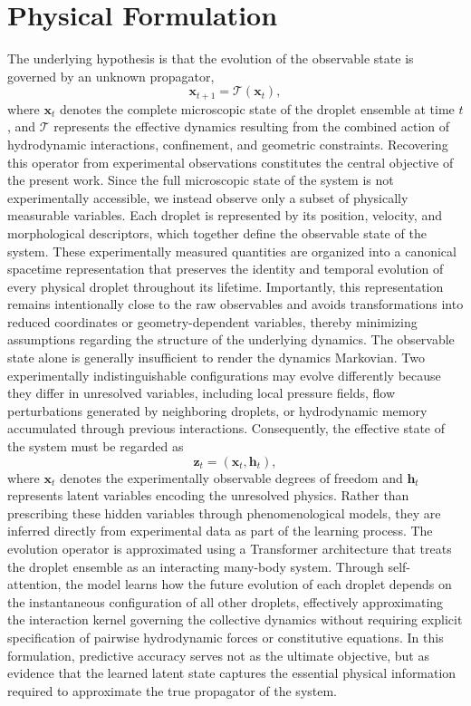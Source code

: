 \documentclass[11pt]{article}
\begin{document}
\section{Physical Formulation}

The underlying hypothesis is that the evolution of the observable state 
is governed by an unknown propagator,
\[
\mathbf{x}_{t+1}=\mathcal{T}(\mathbf{x}_t),
\]
where $\mathbf{x}_t$ denotes the complete microscopic state of the 
droplet ensemble at time $t$, and $\mathcal{T}$ represents the effective 
dynamics resulting from the combined action of hydrodynamic interactions, 
confinement, and geometric constraints. Recovering this operator from 
experimental observations constitutes the central objective of the present work.
Since the full microscopic state of the system is not experimentally 
accessible, we instead observe only a subset of physically measurable 
variables. Each droplet is represented by its position, velocity, and 
morphological descriptors, which together define the observable state of the system. These experimentally measured quantities are organized into a canonical spacetime representation that preserves the identity and temporal evolution of every physical droplet throughout its lifetime. Importantly, this representation remains intentionally close to the raw observables and avoids transformations into reduced coordinates or geometry-dependent variables, thereby minimizing assumptions regarding the structure of the underlying dynamics.
The observable state alone is generally insufficient to render the 
dynamics Markovian. Two experimentally indistinguishable configurations 
may evolve differently because they differ in unresolved variables, 
including local pressure fields, flow perturbations generated by neighboring 
droplets, or hydrodynamic memory accumulated through previous interactions. 
Consequently, the effective state of the system must be regarded as
\[
\mathbf{z}_t=\left(\mathbf{x}_t,\mathbf{h}_t\right),
\]
where $\mathbf{x}_t$ denotes the experimentally observable degrees 
of freedom and $\mathbf{h}_t$ represents latent variables encoding 
the unresolved physics. Rather than prescribing these hidden variables 
through phenomenological models, they are inferred directly 
from experimental data as part of the learning process.
The evolution operator is approximated using a Transformer 
architecture that treats the droplet ensemble as an interacting 
many-body system. Through self-attention, the model learns how the 
future evolution of each droplet depends on the instantaneous configuration
of all other droplets, effectively approximating the interaction 
kernel governing the collective dynamics without requiring explicit 
specification of pairwise hydrodynamic forces or constitutive equations. 
In this formulation, predictive accuracy serves not as the ultimate objective, 
but as evidence that the learned latent state captures the essential physical 
information required to approximate the true propagator of the system.
\end{document}
